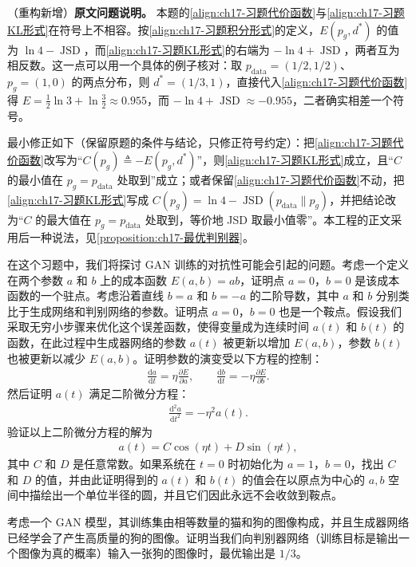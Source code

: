 \documentclass[../../main.tex]{subfiles}
\begin{document}
\begin{remark}（重构新增）\textbf{原文问题说明。}
本题的\eqref{align:ch17-习题代价函数}与\eqref{align:ch17-习题KL形式}在符号上不相容。按\eqref{align:ch17-习题积分形式}的定义，$E(p_g,d^*)$ 的值为 $\ln4-\operatorname{JSD}$，而\eqref{align:ch17-习题KL形式}的右端为 $-\ln4+\operatorname{JSD}$，两者互为相反数。这一点可以用一个具体的例子核对：取 $p_{\mathrm{data}}=(1/2,1/2)$、$p_g=(1,0)$ 的两点分布，则 $d^*=(1/3,1)$，直接代入\eqref{align:ch17-习题代价函数}得 $E=\tfrac12\ln3+\ln\tfrac32\approx0.955$，而 $-\ln4+\operatorname{JSD}\approx-0.955$，二者确实相差一个符号。

最小修正如下（保留原题的条件与结论，只修正符号约定）：把\eqref{align:ch17-习题代价函数}改写为“$C(p_g)\triangleq-E(p_g,d^*)$”，则\eqref{align:ch17-习题KL形式}成立，且“$C$ 的最小值在 $p_g=p_{\mathrm{data}}$ 处取到”成立；或者保留\eqref{align:ch17-习题代价函数}不动，把\eqref{align:ch17-习题KL形式}写成 $C(p_g)=\ln4-\operatorname{JSD}(p_{\mathrm{data}}\|p_g)$，并把结论改为“$C$ 的最大值在 $p_g=p_{\mathrm{data}}$ 处取到，等价地 JSD 取最小值零”。本工程的正文采用后一种说法，见\cref{proposition:ch17-最优判别器}。
\end{remark}

\begin{exercise}[$\star\star\star$]\label{exercise:ch17-02}
在这个习题中，我们将探讨 GAN 训练的对抗性可能会引起的问题。考虑一个定义在两个参数 $a$ 和 $b$ 上的成本函数 $E(a,b)=ab$，证明点 $a=0$，$b=0$ 是该成本函数的一个驻点。考虑沿着直线 $b=a$ 和 $b=-a$ 的二阶导数，其中 $a$ 和 $b$ 分别类比于生成网络和判别网络的参数。证明点 $a=0$，$b=0$ 也是一个鞍点。假设我们采取无穷小步骤来优化这个误差函数，使得变量成为连续时间 $a(t)$ 和 $b(t)$ 的函数，在此过程中生成器网络的参数 $a(t)$ 被更新以增加 $E(a,b)$，参数 $b(t)$ 也被更新以减少 $E(a,b)$。证明参数的演变受以下方程的控制：
\begin{align}
\frac{\mathrm{d}a}{\mathrm{d}t}=\eta\frac{\partial E}{\partial a},\qquad
\frac{\mathrm{d}b}{\mathrm{d}t}=-\eta\frac{\partial E}{\partial b}.
\label{align:ch17-鞍点动力学}
\end{align}
然后证明 $a(t)$ 满足二阶微分方程：
\begin{align}
\frac{\mathrm{d}^2a}{\mathrm{d}t^2}=-\eta^2a(t).
\label{align:ch17-二阶方程}
\end{align}
验证以上二阶微分方程的解为
\begin{align}
a(t)=C\cos(\eta t)+D\sin(\eta t),
\label{align:ch17-二阶方程解}
\end{align}
其中 $C$ 和 $D$ 是任意常数。如果系统在 $t=0$ 时初始化为 $a=1$，$b=0$，找出 $C$ 和 $D$ 的值，并由此证明得到的 $a(t)$ 和 $b(t)$ 的值会在以原点为中心的 $a,b$ 空间中描绘出一个单位半径的圆，并且它们因此永远不会收敛到鞍点。
\end{exercise}

\begin{exercise}[$\star\star$]\label{exercise:ch17-03}
考虑一个 GAN 模型，其训练集由相等数量的猫和狗的图像构成，并且生成器网络已经学会了产生高质量的狗的图像。证明当我们向判别器网络（训练目标是输出一个图像为真的概率）输入一张狗的图像时，最优输出是 $1/3$。
\end{exercise}
\end{document}

